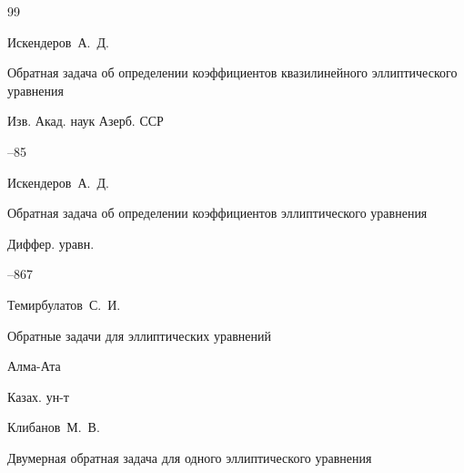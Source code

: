 \begin{thebibliography}{99}

\by Искендеров~А.~Д.

\paper Обратная задача об определении коэффициентов квазилинейного эллиптического уравнения 

\jour Изв. Акад. наук Азерб. ССР



--85










\by  Искендеров~А.~Д. 

\paper Обратная задача об определении коэффициентов эллиптического уравнения 

\jour Диффер. уравн.



--867










\by Темирбулатов~С.~И.

\book Обратные задачи для эллиптических уравнений 

\publaddr Алма-Ата

\publ Казах. ун-т








\by Клибанов~М.~В.

\paper Двумерная обратная задача для одного эллиптического уравнения


\end{thebibliography}
